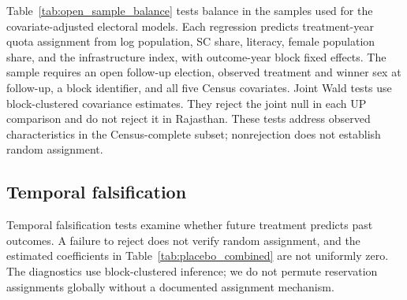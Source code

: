 Table~\ref{tab:open_sample_balance} tests balance in the samples used for the covariate-adjusted electoral models. Each regression predicts treatment-year quota assignment from log population, SC share, literacy, female population share, and the infrastructure index, with outcome-year block fixed effects. The sample requires an open follow-up election, observed treatment and winner sex at follow-up, a block identifier, and all five Census covariates. Joint Wald tests use block-clustered covariance estimates. They reject the joint null in each UP comparison and do not reject it in Rajasthan. These tests address observed characteristics in the Census-complete subset; nonrejection does not establish random assignment.

\begin{table}[!htbp]
    \centering
    \caption{Census Balance in the Open-Election Analysis Samples}
    \label{tab:open_sample_balance}
    
\end{table}
\FloatBarrier

\subsection{Temporal falsification}\label{sec:app_placebo}

Temporal falsification tests examine whether future treatment predicts past outcomes. A failure to reject does not verify random assignment, and the estimated coefficients in Table~\ref{tab:placebo_combined} are not uniformly zero. The diagnostics use block-clustered inference; we do not permute reservation assignments globally without a documented assignment mechanism.

\begin{table}[!htbp]
\centering
\caption{Placebo Tests: Future Treatment Predicting Past Outcomes}
\label{tab:placebo_combined}

\end{table}
\FloatBarrier
